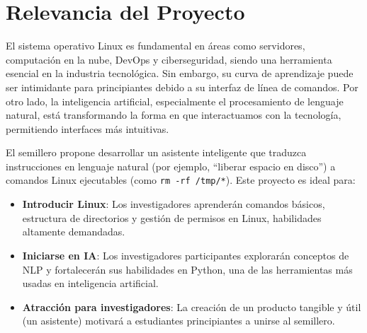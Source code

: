 \documentclass[conference, a4paper]{IEEEtran}
\begin{document}
\section{Relevancia del Proyecto}
El sistema operativo Linux es fundamental en áreas como servidores, computación en la nube, DevOps y ciberseguridad, siendo una herramienta esencial 
en la industria tecnológica. Sin embargo, su curva de aprendizaje puede ser intimidante para principiantes debido a su interfaz de línea de comandos. 
Por otro lado, la inteligencia artificial, especialmente el procesamiento de lenguaje natural, está transformando la forma en que interactuamos con 
la tecnología, permitiendo interfaces más intuitivas.

El semillero propone desarrollar un asistente inteligente que traduzca instrucciones en lenguaje natural (por ejemplo, ``liberar espacio en disco'') 
a comandos Linux ejecutables (como \texttt{rm -rf /tmp/*}). Este proyecto es ideal para:
\begin{itemize}
    \item \textbf{Introducir Linux}: Los investigadores aprenderán comandos básicos, estructura de directorios y gestión de permisos en Linux, 
                                     habilidades altamente demandadas.
    \item \textbf{Iniciarse en IA}: Los investigadores participantes explorarán conceptos de NLP y fortalecerán sus habilidades en Python, 
                                    una de las herramientas más usadas en inteligencia artificial.
    \item \textbf{Atracción para investigadores}: La creación de un producto tangible y útil (un asistente) motivará a estudiantes principiantes
                                                  a unirse al semillero.
\end{itemize}
\end{document}
